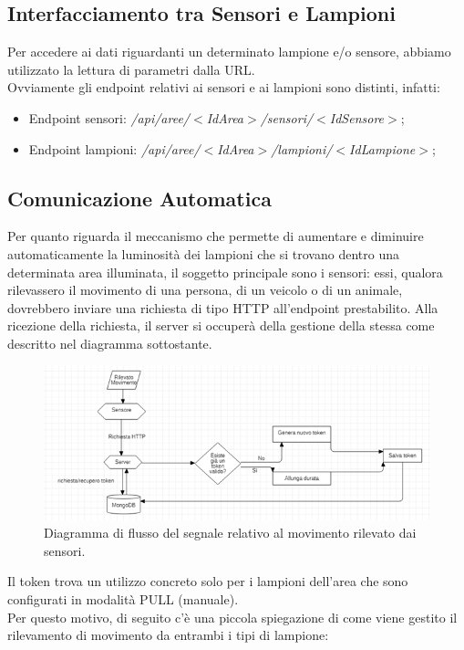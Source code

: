 \documentclass[a4paper, 11pt]{article}
\begin{document}
\subsection{Interfacciamento tra Sensori e Lampioni}
Per accedere ai dati riguardanti un determinato lampione e/o sensore, abbiamo utilizzato la lettura di parametri dalla URL.\\ Ovviamente gli endpoint relativi ai sensori e ai lampioni sono distinti, infatti:
\begin{itemize}
    \item Endpoint sensori: \textit{/api/aree/$<$IdArea$>$/sensori/$<$IdSensore$>$};
    \item Endpoint lampioni: \textit{/api/aree/$<$IdArea$>$/lampioni/$<$IdLampione$>$};
\end{itemize}
\subsection{Comunicazione Automatica}
Per quanto riguarda il meccanismo che permette di aumentare e diminuire automaticamente la luminosità dei lampioni che si trovano dentro una determinata area illuminata, il soggetto principale sono i sensori: essi, qualora rilevassero il movimento di una persona, di un veicolo o di un animale, dovrebbero inviare una richiesta di tipo HTTP all'endpoint prestabilito. Alla ricezione della richiesta, il server si occuperà della gestione della stessa come descritto nel diagramma sottostante.
\begin{figure}[H]
    \centering
    \includegraphics[width=\textwidth]{sensori}
    \caption{Diagramma di flusso del segnale relativo al movimento rilevato dai sensori.}
\end{figure}
Il token trova un utilizzo concreto solo per i lampioni dell'area che sono configurati in modalità PULL (manuale).\\ 
Per questo motivo, di seguito c'è una piccola spiegazione di come viene gestito il rilevamento di movimento da entrambi i tipi di lampione:
\end{document}
